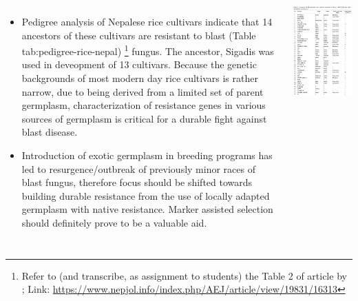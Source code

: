 \documentclass[11pt,dvipsnames,ignorenonframetext,aspectratio=169]{beamer}
\providecommand{\tightlist}{%
  \setlength{\itemsep}{0pt}\setlength{\parskip}{0pt}}
\newcommand{\bcolumns}{\begin{columns}[T, onlytextwidth]}
\newcommand{\ecolumns}{\end{columns}}
\begin{document}
\begin{frame}{}
\protect\hypertarget{section-3}{}
\bcolumns
{}
\footnotesize

\begin{itemize}
\tightlist
\item
  Pedigree analysis of Nepalese rice cultivars indicate that 14
  ancestors of these cultivars are resistant to blast (Table
  tab:pedigree-rice-nepal)
  \footnote[frame]{\scriptsize Refer to (and transcribe, as assignment to students) the Table 2 of article by \cite{joshi2014molecular}; Link: \url{https://www.nepjol.info/index.php/AEJ/article/view/19831/16313}}
  fungus. The ancestor, Sigadis was used in deveopment of 13 cultivars.
  Because the genetic backgrounds of most modern day rice cultivars is
  rather narrow, due to being derived from a limited set of parent
  germplasm, characterization of resistance genes in various sources of
  germplasm is critical for a durable fight against blast disease.\\
\item
  Introduction of exotic germplasm in breeding programs has led to
  resurgence/outbreak of previously minor races of blast fungus,
  therefore focus should be shifted towards building durable resistance
  from the use of locally adapted germplasm with native resistance.
  Marker assisted selection should definitely prove to be a valuable
  aid.
\end{itemize}


\includegraphics[width=0.75\linewidth]{../images/resistance_breeding_rice_blast_pedigree}

\ecolumns
\end{frame}
\end{document}
